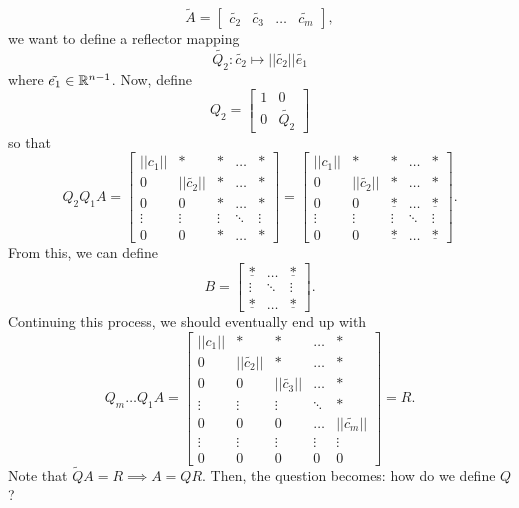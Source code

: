 \documentclass[letterpaper]{article}
\newcommand{\0}{\mathbf{0}}
\begin{document}
\[\tilde{A} = \begin{bmatrix}
    \tilde{c_2} & \tilde{c_3} & \hdots & \tilde{c_m}
\end{bmatrix},\] we want to define a reflector mapping \[\tilde{Q_2}: \tilde{c_2} \mapsto ||\tilde{c_2}|| \tilde{e_1}\] where $\tilde{e_1} \in \mathbb{R}^{n - 1}$. Now, define \[Q_2 = \begin{bmatrix}
    1 & 0 \\ 
    0 & \tilde{Q_2}
\end{bmatrix}\] so that \[Q_2 Q_1 A = \begin{bmatrix}
    ||c_1|| & * & * & \hdots & * \\ 
    0 & ||\tilde{c_2}|| & * & \hdots & * \\ 
    0 & 0 & * & \hdots & * \\
    \vdots & \vdots & \vdots & \ddots & \vdots \\ 
    0 & 0 & * & \hdots & *
\end{bmatrix} = \begin{bmatrix}
    ||c_1|| & * & * & \hdots & * \\ 
    0 & ||\tilde{c_2}|| & * & \hdots & * \\ 
    0 & 0 & \underline{*} & \hdots & \underline{*} \\
    \vdots & \vdots & \vdots & \ddots & \vdots \\ 
    0 & 0 & \underline{*} & \hdots & \underline{*}
\end{bmatrix}.\] From this, we can define \[B = \begin{bmatrix}
    \underline{*} & \hdots & \underline{*} \\ 
    \vdots & \ddots & \vdots \\ 
    \underline{*} & \hdots & \underline{*}
\end{bmatrix}.\] Continuing this process, we should eventually end up with \[Q_m \hdots Q_1 A = \begin{bmatrix}
    ||c_1|| & * & * & \hdots & * \\ 
    0       & ||\tilde{c_2}|| & * & \hdots & * \\ 
    0       & 0               & ||\tilde{c_3}|| & \hdots & * \\ 
    \vdots  & \vdots          & \vdots          & \ddots & * \\ 
    0       & 0               & 0               & \hdots & ||\tilde{c_m}|| \\ 
    \vdots  & \vdots          & \vdots          & \vdots & \vdots \\ 
    0 & 0 & 0 & 0 & 0
\end{bmatrix} = R.\]
Note that $\tilde{Q}A = R \implies A = QR$. Then, the question becomes: how do we define $Q$? 
\end{document}
